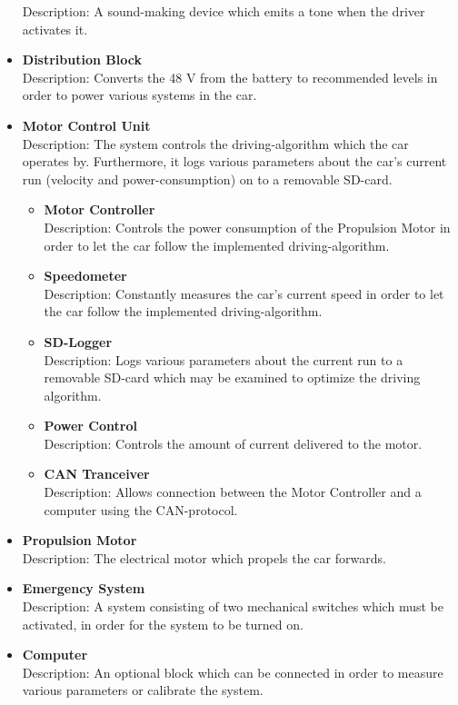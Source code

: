 \begin{itemize}
	Description: A sound-making device which emits a tone when the driver activates it.
	\item \textbf{Distribution Block}\\ 
	Description: Converts the 48 V from the battery to recommended levels in order to power various systems in the car.
	\item \textbf{Motor Control Unit}\\
	Description: The system controls the driving-algorithm which the car operates by. Furthermore, it logs various parameters about the car's current run (velocity and power-consumption) on to a removable SD-card.
	\begin{itemize}
		\item \textbf{Motor Controller}\\
		Description: Controls the power consumption of the Propulsion Motor in order to let the car follow the implemented driving-algorithm. 
		\item \textbf{Speedometer}\\
		Description: Constantly measures the car's current speed in order to let the car follow the implemented driving-algorithm.
		\item \textbf{SD-Logger}\\
		Description: Logs various parameters about the current run to a removable SD-card which may be examined to optimize the driving algorithm.
		\item \textbf{Power Control}\\
		Description: Controls the amount of current delivered to the motor.
		\item \textbf{CAN Tranceiver}\\
		Description: Allows connection between the Motor Controller and a computer using the CAN-protocol.
	\end{itemize}
	\item \textbf{Propulsion Motor}\\
	Description: The electrical motor which propels the car forwards.
	\item \textbf{Emergency System}\\
	Description: A system  consisting of two mechanical switches  which must be activated, in order for the system to be turned on.
	\item \textbf{Computer}\\
	Description: An optional block which can be connected in order to measure various parameters or calibrate the system.
\end{itemize}